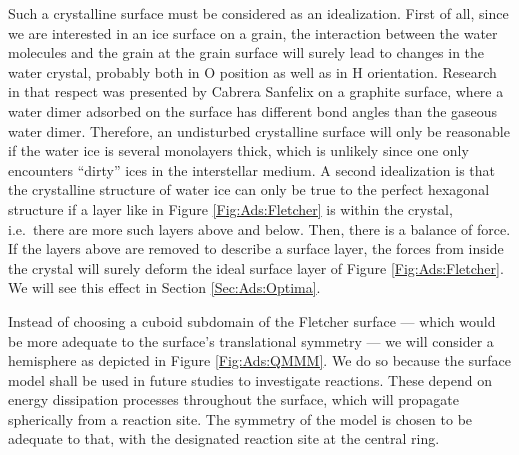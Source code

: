 Such a crystalline surface must be considered as an idealization. First of all,
since we are interested in an ice surface on a grain, the interaction between
the water molecules and the grain at the grain surface will surely lead to
changes in the water crystal, probably both in O position as well as in H
orientation.
Research in that respect was presented by Cabrera Sanfelix
\etal\cite{CabreraSanfelix2003} on a graphite surface, where a water dimer
adsorbed on the surface has different bond angles than the gaseous water dimer.
Therefore, an undisturbed crystalline surface will only be reasonable if the
water ice is several monolayers thick, which is unlikely since one only
encounters ``dirty'' ices in the interstellar
medium.\cite{BoogertGerakinesWhittet2015} A second idealization is that the crystalline structure of water ice can only be true to the perfect hexagonal structure if a layer like
in Figure \ref{Fig:Ads:Fletcher} is within the crystal, i.e.\ there are more
such layers above and below. Then, there is a balance of force. If the layers
above are removed to describe a surface layer, the forces from inside the
crystal will surely deform the ideal surface layer of Figure
\ref{Fig:Ads:Fletcher}.
We will see this effect in Section \ref{Sec:Ads:Optima}.

Instead of choosing a cuboid subdomain of the Fletcher surface --- which would be more adequate
to the surface's translational symmetry --- we will consider a hemisphere as depicted in Figure
\ref{Fig:Ads:QMMM}. We do so because the surface model shall be used in future studies
to investigate reactions. These depend on energy dissipation processes throughout the
surface, which will propagate spherically from a reaction site. The symmetry of the model
is chosen to be adequate to that, with the designated reaction site at the
central ring.

\label{Sec:Ads:QM/MM}

